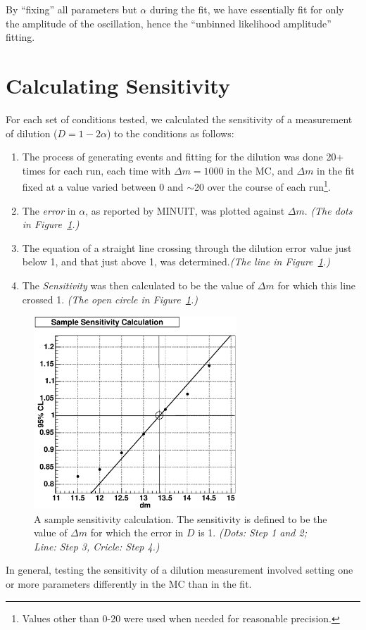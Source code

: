 \documentclass{article}
\begin{document}
\noindent By ``fixing'' all parameters but $\alpha$ during the fit, we have essentially fit for only the amplitude of the oscillation, hence the ``unbinned likelihood amplitude'' fitting.

\section{Calculating Sensitivity \label{calcsens}}

For each set of conditions tested, we calculated the sensitivity of a measurement of dilution ($D = 1-2\alpha$) to the conditions as follows:

\begin{enumerate}
\item The process of generating events and fitting for the dilution was done 20+ times for each run, each time with $\Delta m=1000$ in the MC, and $\Delta m$ in the fit fixed at a value varied between 0 and $\sim$20 over the course of each run\footnote{Values other than 0-20 were used when needed for reasonable precision.}.
\item The {\em error} in $\alpha$, as reported by MINUIT, was plotted against $\Delta m$. {\em (The dots in Figure~\ref{sample}.)}
\item The equation of a straight line crossing through the dilution error value just below 1, and that just above 1, was determined.{\em (The line in Figure~\ref{sample}.)}
\item The {\em Sensitivity} was then calculated to be the value of $\Delta m$ for which this line crossed 1. {\em (The open circle in Figure~\ref{sample}.)}
\end{enumerate}

\begin{figure}
\begin{center}
\includegraphics[width=3in]{sample.eps}
\caption{A sample sensitivity calculation.  The sensitivity is defined to be the value of $\Delta m$ for which the error in $D$ is 1. {\em (Dots: Step 1 and 2; Line: Step 3, Cricle: Step 4.)}}
\label{sample}
\end{center}
\end{figure}
\noindent In general, testing the sensitivity of a dilution measurement involved setting one or more parameters differently in the MC than in the fit.
\end{document}
